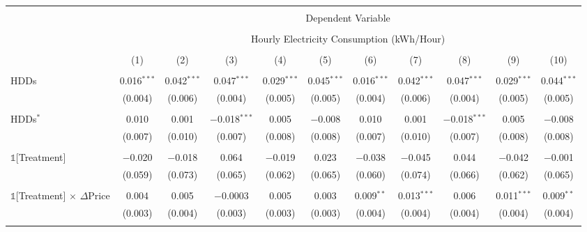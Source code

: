 
\begin{table}[!htbp] \centering 
  \label{Table:Breakdown-of-Average-Treatement-Effects_As-a-Function-of-Rate-Changes_Using-Rate-Changes-in-Peak-Hours_Excluding-Tariff-Group-C} 
\scriptsize 
\begin{longtable}{@{\extracolsep{0pt}}lcccccccccc} 
\\[-1.8ex]\hline 
\hline \\[-1.8ex] 
 & \multicolumn{10}{c}{Dependent Variable} \\ 
\cline{2-11} 
\\[-1.8ex] & \multicolumn{10}{c}{Hourly Electricity Consumption  (kWh/Hour)} \\ 
\\[-1.8ex] & (1) & (2) & (3) & (4) & (5) & (6) & (7) & (8) & (9) & (10)\\ 
\hline \\[-1.8ex] \endhead
 HDDs & 0.016$^{***}$ & 0.042$^{***}$ & 0.047$^{***}$ & 0.029$^{***}$ & 0.045$^{***}$ & 0.016$^{***}$ & 0.042$^{***}$ & 0.047$^{***}$ & 0.029$^{***}$ & 0.044$^{***}$ \\ 
  & (0.004) & (0.006) & (0.004) & (0.005) & (0.005) & (0.004) & (0.006) & (0.004) & (0.005) & (0.005) \\ 
  & & & & & & & & & & \\ 
 HDDs$^{*}$ & 0.010 & 0.001 & $-$0.018$^{***}$ & 0.005 & $-$0.008 & 0.010 & 0.001 & $-$0.018$^{***}$ & 0.005 & $-$0.008 \\ 
  & (0.007) & (0.010) & (0.007) & (0.008) & (0.008) & (0.007) & (0.010) & (0.007) & (0.008) & (0.008) \\ 
  & & & & & & & & & & \\ 
 $\mathbb{1}$[Treatment] & $-$0.020 & $-$0.018 & 0.064 & $-$0.019 & 0.023 & $-$0.038 & $-$0.045 & 0.044 & $-$0.042 & $-$0.001 \\ 
  & (0.059) & (0.073) & (0.065) & (0.062) & (0.065) & (0.060) & (0.074) & (0.066) & (0.062) & (0.065) \\ 
  & & & & & & & & & & \\ 
 $\mathbb{1}$[Treatment] $\times$ $\Delta$Price & 0.004 & 0.005 & $-$0.0003 & 0.005 & 0.003 & 0.009$^{**}$ & 0.013$^{***}$ & 0.006 & 0.011$^{***}$ & 0.009$^{**}$ \\ 
  & (0.003) & (0.004) & (0.003) & (0.003) & (0.003) & (0.004) & (0.004) & (0.004) & (0.004) & (0.004) \\ 
  & & & & & & & & & & \\ 

\end{longtable}
\end{table}

